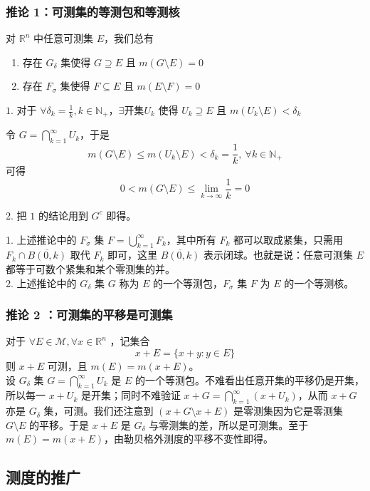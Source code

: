 \documentclass{ctexbook}
\newcommand{\no}{\noindent}
\newcommand{\pro}{\no{\bf 证明：}}
\newcommand{\R}{\mathbb{R}}
\newcommand{\ITEMS}{\begin{enumerate}[leftmargin=4em]}
\newcommand{\ITEME}{\end{enumerate}}
\begin{document}
\subsubsection{推论 1：可测集的等测包和等测核}

对 $\R^n$ 中任意可测集 $E$，我们总有
\ITEMS
	\item 存在 $G_\delta$ 集使得 $G \supseteq E$ 且 $m(G\setminus E) = 0$
	\item 存在 $F_\sigma$ 集使得 $F \subseteq E$ 且 $m(E\setminus F) = 0$
\ITEME 

\pro 

$1.$ 对于 $\forall \delta_k = \frac1k, k\in \mathbb{N}_+$，$\exists \text{开集} U_k$ 使得 $U_k \supseteq E$ 且 $m(U_k \setminus E) < \delta_k$

令 $G = \bigcap\limits_{k=1}^\infty U_k$，于是
\[
	m(G\setminus E) \le m(U_k\setminus E) < \delta_k= \frac1k,\ \forall k\in\mathbb{N}_+
\]
可得
\[
	0 < m(G\setminus E) \le \lim_{k \to \infty} \frac1k = 0
\]

$2.$ 把 $1$ 的结论用到 $G^c$ 即得。

\no {\bf 注：}

1. 上述推论中的 $F_\sigma$ 集 $F = \bigcup_{k=1}^\infty F_k$，其中所有 $F_k$ 都可以取成紧集，只需用 $F_k\cap \overline {B(0,k)}$ 取代 $F_k$ 即可，这里 $\overline {B(0,k)}$ 表示闭球。也就是说：任意可测集 $E$ 都等于可数个紧集和某个零测集的并。\\

2. 上述推论中的 $G_\delta$ 集 $G$ 称为 $E$ 的一个等测包，$F_\sigma$ 集 $F$ 为 $E$ 的一个等测核。

\subsubsection{推论 2 ：可测集的平移是可测集}

对于 $\forall E \in \mathcal{M}, \forall x\in \R^n$ ，记集合
\[
	x+E=\{x+y : y \in E\}
\] 
则 $x+E$ 可测，且 $m(E)=m(x+E)$。\\

\pro 设 $G_\delta$ 集 $G= \bigcap\limits_{k=1}^\infty U_k$ 是 $E$ 的一个等测包。不难看出任意开集的平移仍是开集，所以每一 $x+U_k$ 是开集；同时不难验证 $x+G= \bigcap\limits_{k=1}^\infty (x+U_k)$，从而 $x+G$ 亦是 $G_\delta$ 集，可测。我们还注意到 $(x+G \setminus x+E)$ 是零测集因为它是零测集 $G \setminus E$ 的平移。于是 $x+E$ 是 $G_\delta$ 与零测集的差，所以是可测集。至于 $m(E)=m(x+E)$，由勒贝格外测度的平移不变性即得。

\subsection{测度的推广}
\end{document}
